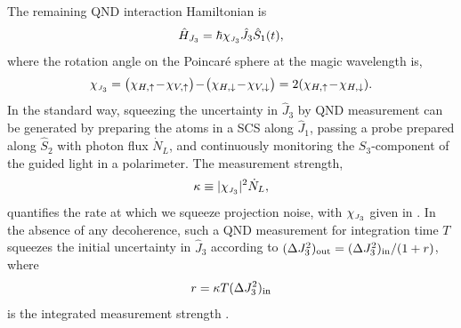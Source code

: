 \documentclass[aps,pra,twocolumn]{revtex4-1} %
\newcommand{\inp}{{\rm in}}
\newcommand{\jx}{\hat{J}_1}
\newcommand{\jz}{\hat{J}_3}
\newcommand{\chieff}{\chi_{\raisebox{-.1pt}{\tiny $J_3$}}}
\begin{document}
The remaining QND interaction Hamiltonian is
	\begin{equation} \label{Eq::FaradayHam}
		\hat{H}_{J_3} = \hbar \chieff \jz \hat{S}_1(t),
	\end{equation}
where the rotation angle on the Poincar\'{e} sphere at the magic wavelength is,
\begin{equation}\label{eq:chiJ3}
\chieff = \big( \chi_{H, \uparrow} \!-\! \chi_{V,\uparrow} \big) \!-\! \big(\chi_{H,\downarrow} \!-\! \chi_{V,\downarrow} \big) = 2(\chi_{H, \uparrow}\!-\!\chi_{H, \downarrow}).
\end{equation}
In the standard way, squeezing the uncertainty in $\jz$ by QND measurement can be generated by preparing the atoms in a SCS along $\jx$, passing a probe prepared along $\hat{S}_2$ with photon flux $\dot{N}_L$, and continuously monitoring the $S_3$-component of the guided light in a polarimeter. The measurement strength,
	\begin{align} \label{Eq::MeasurementStrength}
		\kappa \equiv |\chieff|^2 \dot{N}_L, 
	\end{align}
quantifies the rate at which we squeeze projection noise, with $\chieff$ given in . 
In the absence of any decoherence, such a QND measurement for integration time $T$ squeezes the initial uncertainty in $\jz$ according to $(\Delta J_3^2)_{\rm out}= (\Delta J_3^2)_{\rm in}/(1+r)$, where
	\begin{equation}
		r = \kappa T  (\Delta J_3^2)_{\inp}
	\end{equation}
is the integrated measurement strength \cite{hammerer_quantum_2010, baragiola_three-dimensional_2014}.
\end{document}
